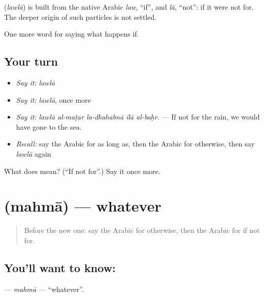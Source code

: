 \begin{cousinweb}
\textbf{} (\emph{lawlā}) is built from the native Arabic \emph{law}, \textquotedblleft{}if\textquotedblright{}, and \emph{lā}, \textquotedblleft{}not\textquotedblright{}: if it were not for. The deeper origin of such particles is not settled.
\end{cousinweb}

\begin{grammarlens}[title={What you've built}]
One more word for saying what happens if.
\end{grammarlens}

\subsection*{Your turn}
\begin{itemize}
\raggedright
  \item \emph{Say it:} \emph{lawlā}
  \item \emph{Say it:} \emph{lawlā}, once more
  \item \emph{Say it:} \emph{lawlā al-maṭar la-dhahabnā ilā al-baḥr.} — If not for the rain, we would have gone to the sea.
  \item \emph{Recall:} say the Arabic for as long as, then the Arabic for otherwise, then say \emph{lawlā} again
\end{itemize}

\begin{tcolorbox}[breakable,colback=teal!4,colframe=teal!35!black,title={Before you move on}]
What does  mean? (\textquotedblleft{}If not for\textquotedblright{}.) Say it once more.
\end{tcolorbox}
\section[\texorpdfstring{\ar{مهما} (mahmā)}{مهما (mahmā)}]{ (mahmā) — whatever}

\label{lesson:AR-C400-mahma}



\begin{quote}
Before the new one: say the Arabic for otherwise, then the Arabic for if not for.
\end{quote}

\subsection*{You'll want to know: }
\textbf{} — \emph{mahmā} — \textquotedblleft{}whatever\textquotedblright{}.

